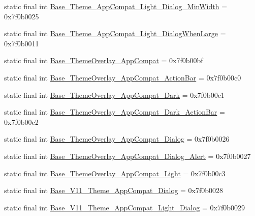 \begin{CompactItemize}
\item 
static final int \hyperlink{classandroid_1_1support_1_1graphics_1_1drawable_1_1animated_1_1_r_1_1style_dd051d8a607bb1ed745b7463c8975f74}{Base\_\-Theme\_\-AppCompat\_\-Light\_\-Dialog\_\-MinWidth} = 0x7f0b0025
\item 
static final int \hyperlink{classandroid_1_1support_1_1graphics_1_1drawable_1_1animated_1_1_r_1_1style_a1bf249ee7f98ad1f14cac2c250a6a7a}{Base\_\-Theme\_\-AppCompat\_\-Light\_\-DialogWhenLarge} = 0x7f0b0011
\item 
static final int \hyperlink{classandroid_1_1support_1_1graphics_1_1drawable_1_1animated_1_1_r_1_1style_4163851fb6ee51194af46b3bc06f3aa0}{Base\_\-ThemeOverlay\_\-AppCompat} = 0x7f0b00bf
\item 
static final int \hyperlink{classandroid_1_1support_1_1graphics_1_1drawable_1_1animated_1_1_r_1_1style_f193dd1f16d19b72dfd3c7a7ddf3783f}{Base\_\-ThemeOverlay\_\-AppCompat\_\-ActionBar} = 0x7f0b00c0
\item 
static final int \hyperlink{classandroid_1_1support_1_1graphics_1_1drawable_1_1animated_1_1_r_1_1style_1734536490013294f036697b50a087ee}{Base\_\-ThemeOverlay\_\-AppCompat\_\-Dark} = 0x7f0b00c1
\item 
static final int \hyperlink{classandroid_1_1support_1_1graphics_1_1drawable_1_1animated_1_1_r_1_1style_5e2bd5d896b7de2b2d038c0b6dcc0179}{Base\_\-ThemeOverlay\_\-AppCompat\_\-Dark\_\-ActionBar} = 0x7f0b00c2
\item 
static final int \hyperlink{classandroid_1_1support_1_1graphics_1_1drawable_1_1animated_1_1_r_1_1style_a2d788393c9f16c6535e8741d149393d}{Base\_\-ThemeOverlay\_\-AppCompat\_\-Dialog} = 0x7f0b0026
\item 
static final int \hyperlink{classandroid_1_1support_1_1graphics_1_1drawable_1_1animated_1_1_r_1_1style_84389705952d652f83591bdd6a8c08ca}{Base\_\-ThemeOverlay\_\-AppCompat\_\-Dialog\_\-Alert} = 0x7f0b0027
\item 
static final int \hyperlink{classandroid_1_1support_1_1graphics_1_1drawable_1_1animated_1_1_r_1_1style_6c9844deb4e4959a9a198fd97b7f94e3}{Base\_\-ThemeOverlay\_\-AppCompat\_\-Light} = 0x7f0b00c3
\item 
static final int \hyperlink{classandroid_1_1support_1_1graphics_1_1drawable_1_1animated_1_1_r_1_1style_2b492657e94438907e3bcd5fa73312fb}{Base\_\-V11\_\-Theme\_\-AppCompat\_\-Dialog} = 0x7f0b0028
\item 
static final int \hyperlink{classandroid_1_1support_1_1graphics_1_1drawable_1_1animated_1_1_r_1_1style_200c46ac0ea083be6cb0beb60cefd866}{Base\_\-V11\_\-Theme\_\-AppCompat\_\-Light\_\-Dialog} = 0x7f0b0029

\end{CompactItemize}

